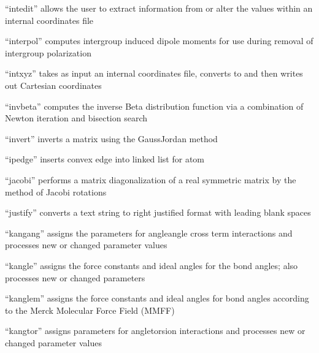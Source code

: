 \documentclass[letterpaper,11pt,english]{sphinxmanual}
\begin{document}

“intedit” allows the user to extract information from
or alter the values within an internal coordinates file


“interpol” computes intergroup induced dipole moments for use
during removal of intergroup polarization


“intxyz” takes as input an internal coordinates file,
converts to and then writes out Cartesian coordinates


“invbeta” computes the inverse Beta distribution function
via a combination of Newton iteration and bisection search


“invert” inverts a matrix using the Gauss\sphinxhyphen{}Jordan method


“ipedge” inserts convex edge into linked list for atom


“jacobi” performs a matrix diagonalization of a real
symmetric matrix by the method of Jacobi rotations


“justify” converts a text string to right justified format
with leading blank spaces


“kangang” assigns the parameters for angle\sphinxhyphen{}angle cross term
interactions and processes new or changed parameter values


“kangle” assigns the force constants and ideal angles for
the bond angles; also processes new or changed parameters


“kanglem” assigns the force constants and ideal angles for
bond angles according to the Merck Molecular Force Field (MMFF)


“kangtor” assigns parameters for angle\sphinxhyphen{}torsion interactions
and processes new or changed parameter values
\end{document}
